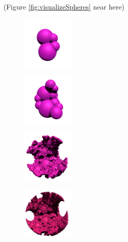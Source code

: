 \documentclass[suppldata, dvipdfmx]{interact}
\theoremstyle{plain}%
\theoremstyle{definition}
\theoremstyle{remark}
\theoremstyle{problemstyle}
\begin{document}
\noindent(Figure \ref{fig:visualizeSpheres}
 near here)

\begin{figure}[h!tbp]
 \begin{minipage}[t]{0.18\textwidth}
  \centering
  \includegraphics[width=1in, height=1in, keepaspectratio]{./img/visualization/sphereStep1.jpg}
  \label{fig:visualizeSpheresStep1}
 \end{minipage}
 \hspace*{\fill}
 \begin{minipage}[t]{0.18\textwidth}
  \centering
  \includegraphics[width=1in, height=1in, keepaspectratio]{./img/visualization/sphereStep2.jpg}
  \label{fig:visualizeSpheresStep2}
 \end{minipage}
 \hspace*{\fill}
 \begin{minipage}[t]{0.18\textwidth}
  \centering
  \includegraphics[width=1in, height=1in, keepaspectratio]{./img/visualization/sphereStep5.jpg}
  \label{fig:visualizeSpheresStep5}
 \end{minipage}
 \hspace*{\fill}
 \begin{minipage}[t]{0.18\textwidth}
  \centering
  \includegraphics[width=1in, height=1in, keepaspectratio]{./img/visualization/sphereStep10.jpg}

\end{minipage}
\end{figure}
\end{document}
